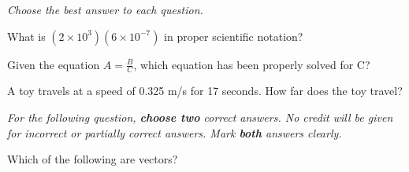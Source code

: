 \documentclass[11pt]{examdesign}
\begin{document}
\begin{multiplechoice} [title={Multiple Choice},
	rearrange=no]
	\textit{Choose the best answer to each question.} 
	
	\begin{question}
	What is $ (2 \times 10^3) (6 \times 10^{-7}) $ in proper scientific notation?
\end{question}

\begin{question}
	Given the equation $A = \frac{B}{C} $, which equation has been properly solved for C?
	
	\end{question}

\begin{question}
	A toy travels at a speed of 0.325 m/s for 17 seconds.  How far does the toy travel?
\end{question}


\end{multiplechoice}

\begin{multiplechoice} [title={Multiple Correct Multiple Choice},
	rearrange=no]
	\textit{For the following question, \textbf{choose two} correct answers.  No credit will be given for incorrect or partially correct answers.  Mark \textbf{both} answers clearly.} 
	
	
	\begin{question}
		Which of the following are vectors?
	\end{question}

\vspace{1in}	
\end{multiplechoice}
\end{document}
